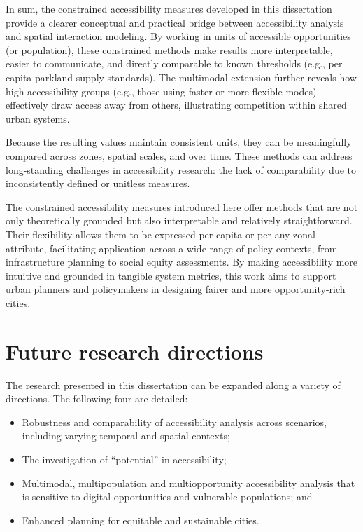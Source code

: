 \documentclass[
11pt, %
oneside, %
english, %
singlespacing, %
]{macthesis} %
\def\tightlist{}
\begin{document}
In sum, the constrained accessibility measures developed in this dissertation provide a clearer conceptual and practical bridge between accessibility analysis and spatial interaction modeling. By working in units of accessible opportunities (or population), these constrained methods make results more interpretable, easier to communicate, and directly comparable to known thresholds (e.g., per capita parkland supply standards). The multimodal extension further reveals how high-accessibility groups (e.g., those using faster or more flexible modes) effectively draw access away from others, illustrating competition within shared urban systems.

Because the resulting values maintain consistent units, they can be meaningfully compared across zones, spatial scales, and over time. These methods can address long-standing challenges in accessibility research: the lack of comparability due to inconsistently defined or unitless measures.

The constrained accessibility measures introduced here offer methods that are not only theoretically grounded but also interpretable and relatively straightforward. Their flexibility allows them to be expressed per capita or per any zonal attribute, facilitating application across a wide range of policy contexts, from infrastructure planning to social equity assessments. By making accessibility more intuitive and grounded in tangible system metrics, this work aims to support urban planners and policymakers in designing fairer and more opportunity-rich cities.

\section{Future research directions}\label{future-research-directions}

The research presented in this dissertation can be expanded along a variety of directions. The following four are detailed:

\begin{itemize}
\tightlist
\item
  Robustness and comparability of accessibility analysis across scenarios, including varying temporal and spatial contexts;
\item
  The investigation of ``potential'' in accessibility;
\item
  Multimodal, multipopulation and multiopportunity accessibility analysis that is sensitive to digital opportunities and vulnerable populations; and
\item
  Enhanced planning for equitable and sustainable cities.
\end{itemize}
\end{document}
